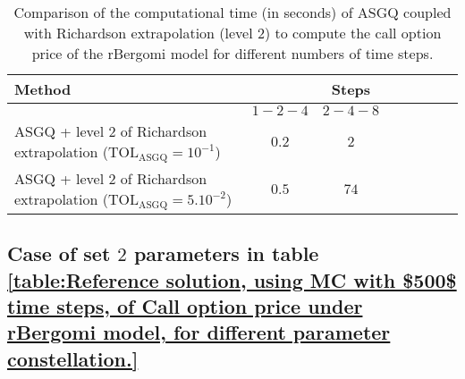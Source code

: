 \begin{table}[!h]
	\centering
	\begin{tabular}{l*{6}{c}r}
		\toprule[1.5pt]
		Method & & Steps  & &     \\
		\hline
		& $1-2-4$ & $2-4-8$   \\
		\hline
		
		ASGQ + level $2$ of  Richardson extrapolation ($\text{TOL}_{\text{ASGQ}}=10^{-1}$)  & $0.2$ & $2$ &   \\
		ASGQ + level $2$ of  Richardson extrapolation ($\text{TOL}_{\text{ASGQ}}=5.10^{-2}$)  & $0.5$ & $74$  \\
		\bottomrule[1.25pt]
	\end{tabular}
	\caption{Comparison of the computational time (in seconds) of ASGQ coupled with Richardson extrapolation (level $2$) to compute the call option price of the rBergomi model for different numbers of time steps.}
	\label{Comparsion of the computational time of  MC and MISC, using Richardson extrapolation (level $2$), used to compute Call option price of rBergomi model for different number of time steps. Case set $2$ parameters,linear}
\end{table}
\FloatBarrier


\subsection{Case of set $2$ parameters in table \ref{table:Reference solution, using MC with $500$ time steps, of Call option price under rBergomi model, for different parameter constellation.} }
\label{appendix:Case of set $2$ parameters}

\FloatBarrier

